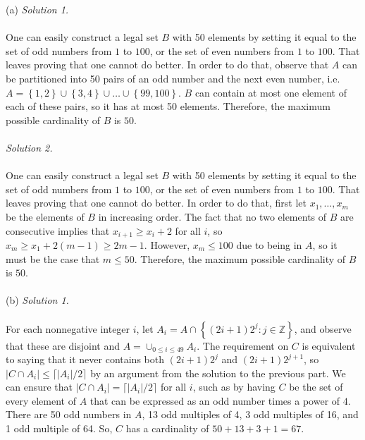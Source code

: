 \begin{solution}
    (a)
    \textit{Solution 1.}
    \\\\
    One can easily construct a legal set \( B \) with 50 elements by setting it equal to the set of odd numbers from \( 1 \) to \( 100 \), or the set of even numbers from \( 1 \) to \( 100 \). That leaves proving that one cannot do better. In order to do that, observe that \( A \) can be partitioned into 50 pairs of an odd number and the next even number, i.e. \( A = \left\{1, 2\right\} \cup \left\{3, 4\right\} \cup \ldots \cup \left\{99, 100\right\} \). \( B \) can contain at most one element of each of these pairs, so it has at most 50 elements. Therefore, the maximum possible cardinality of \( B \) is \( 50 \).
    \\\\
    \textit{Solution 2.}
    \\\\
    One can easily construct a legal set \( B \) with 50 elements by setting it equal to the set of odd numbers from \( 1 \) to \( 100 \), or the set of even numbers from \( 1 \) to \( 100 \). That leaves proving that one cannot do better. In order to do that, first let \( x_1, \ldots, x_m \) be the elements of \( B \) in increasing order. The fact that no two elements of \( B \) are consecutive implies that \( x_{i+1} \geq x_i + 2 \) for all \( i \), so \( x_m \geq x_1 + 2\left(m-1\right) \geq 2m-1 \). However, \( x_m \leq 100 \) due to being in \( A \), so it must be the case that \( m \leq 50 \). Therefore, the maximum possible cardinality of \( B \) is \( 50 \).
    \\\\
    (b)
    \textit{Solution 1.}
    \\\\
    For each nonnegative integer \( i \), let \( A_i = A \cap \left\{\left(2i+1\right)2^j : j \in \mathbb{Z}\right\} \), and observe that these are disjoint and \( A = \cup_{0 \leq i \leq 49} A_i \). The requirement on \( C \) is equivalent to saying that it never contains both \( \left(2i+1\right)2^j \) and \( \left(2i+1\right)2^{j+1} \), so \( |C \cap A_i| \leq \lceil |A_i|/2 \rceil \) by an argument from the solution to the previous part. We can ensure that \( |C \cap A_i| = \lceil |A_i|/2 \rceil \) for all \( i \), such as by having \( C \) be the set of every element of \( A \) that can be expressed as an odd number times a power of \( 4 \). There are 50 odd numbers in \( A \), 13 odd multiples of 4, 3 odd multiples of 16, and 1 odd multiple of 64. So, \( C \) has a cardinality of \( 50 + 13 + 3 + 1 = \boxed{67} \).

\end{solution}
